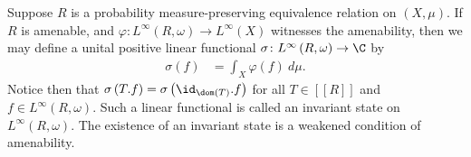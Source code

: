 \documentclass[10pt]{mypackage}
\begin{document}
Suppose $R$ is a probability measure-preserving equivalence relation on $\left( X,\mu \right)$. If $R$ is amenable, and $\varphi\colon L^{\infty}\left( R,\omega \right)\to L^{\infty}\left( X \right)$ witnesses the amenability, then we may define a unital positive linear functional $\sigma\colon L^{\infty}\left( R,\omega \right)\to \C$ by
\begin{align*}
  \sigma\left( f \right) &= \int_{X}^{} \varphi\left( f \right)\:d\mu.
\end{align*}
Notice then that $\sigma\left( T.f \right) = \sigma\left( \id_{\dom(T)}.f \right)$ for all $T\in \left[ \left[ R \right] \right]$ and $f\in L^{\infty}\left( R,\omega \right)$. Such a linear functional is called an invariant state on $L^{\infty}\left( R,\omega \right)$. The existence of an invariant state is a weakened condition of amenability.
\end{document}
